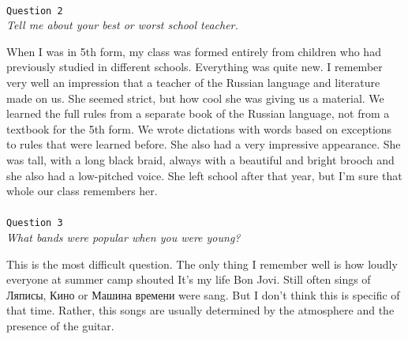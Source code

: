\documentclass[10pt]{article}
\begin{document}
\hline
\ \\[0.2 cm]
{\large\texttt{Question 2}}
\\
\textit{Tell me about your best or worst school teacher.
}
\ \\[0.3cm]
\medskip\par 
When I was in 5th form, my class was formed entirely from children who had previously studied in different schools. Everything was quite new. I remember very well an impression that a teacher of the Russian language and literature made on us. She seemed strict, but how cool she was giving us a material. We learned the full rules from a separate book of the Russian language, not from a textbook for the 5th form. We wrote dictations with words based on exceptions to rules that were learned before. She also had a very impressive appearance. She was tall, with a long black braid, always with a beautiful and bright brooch and she also had a low-pitched voice. She left school after that year, but I'm sure that whole our class remembers her.
\ \\[0.2 cm]
\hline
\ \\[0.2 cm]
{\large\texttt{Question 3}}
\ \\[0.1cm]
\textit{What bands were popular when you were young?
}
\ \\[0.3cm]
\medskip\par 
This is the most difficult question. The only thing I remember well is how loudly everyone at summer camp shouted It's my life Bon Jovi. Still often sings of Ляписы, Кино or Машина времени were sang. But I don't think this is specific of that time. Rather, this songs are usually determined by the atmosphere and the presence of the guitar.
\ \\[0.5 cm]
\hline
\end{document}
